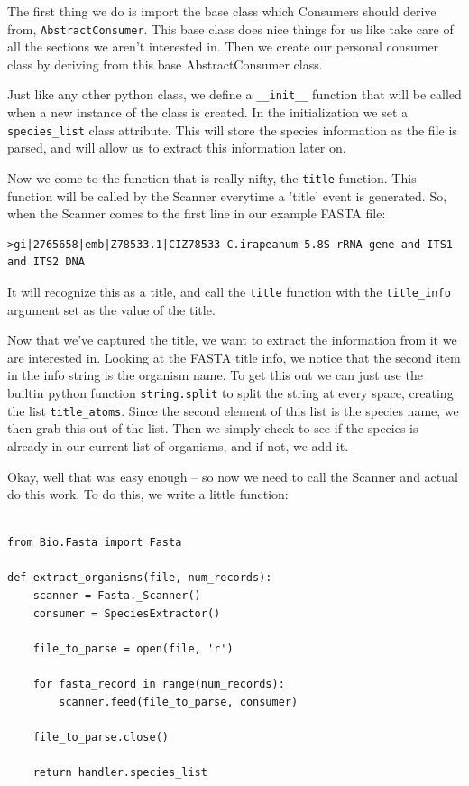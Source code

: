 \documentclass{article}
\begin{document}
The first thing we do is import the base class which Consumers should derive from, \verb|AbstractConsumer|. This base class does nice things for us like take care of all the sections we aren't interested in. Then we create our personal consumer class by deriving from this base AbstractConsumer class.


Just like any other python class, we define a \verb|__init__| function that will be called when a new instance of the class is created. In the initialization we set a \verb|species_list| class attribute. This will store the species information as the file is parsed, and will allow us to extract this information later on.


Now we come to the function that is really nifty, the \verb|title| function. This function will be called by the Scanner everytime a 'title' event is generated. So, when the Scanner comes to the first line in our example FASTA file:

\begin{verbatim}
>gi|2765658|emb|Z78533.1|CIZ78533 C.irapeanum 5.8S rRNA gene and ITS1 and ITS2 DNA
\end{verbatim}

It will recognize this as a title, and call the \verb|title| function with the \verb|title_info| argument set as the value of the title.


Now that we've captured the title, we want to extract the information from it we are interested in. Looking at the FASTA title info, we notice that the second item in the info string is the organism name. To get this out we can just use the builtin python function \verb|string.split| to split the string at every space, creating the list \verb|title_atoms|. Since the second element of this list is the species name, we then grab this out of the list. Then we simply check to see if the species is already in our current list of organisms, and if not, we add it.


Okay, well that was easy enough -- so now we need to call the Scanner and actual do this work. To do this, we write a little function:

\begin{verbatim}

from Bio.Fasta import Fasta

def extract_organisms(file, num_records):
    scanner = Fasta._Scanner()
    consumer = SpeciesExtractor()

    file_to_parse = open(file, 'r')

    for fasta_record in range(num_records):
        scanner.feed(file_to_parse, consumer)

    file_to_parse.close()

    return handler.species_list

\end{verbatim}
\end{document}
